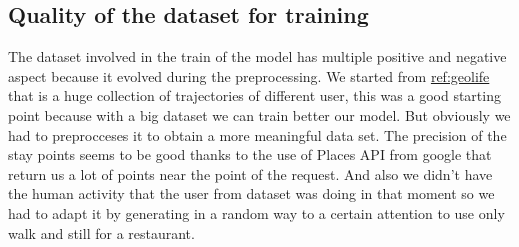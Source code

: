 \documentclass[../../main]{subfiles}
\begin{document}
\subsection{Quality of the dataset for training}

The dataset involved in the train of the model has multiple positive and negative aspect because it evolved during the preprocessing.
We started from \hyperref[geolife dataset]{ref:geolife} that is a huge collection of trajectories of different user, this was a good starting point 
because with a big dataset we can train better our model. But obviously we had to preprocceses it to obtain a more meaningful data set. 
The precision of the stay points seems to be good thanks to the use of Places API from google that return us a lot of points near the point of the request.
And also we didn't have the human activity that the user from dataset was doing in that moment so we had to adapt it by generating in a random way to a certain
attention to use only walk and still for a restaurant.
\end{document}
